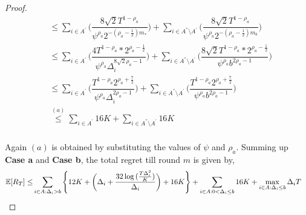 \begin{proof}
\begin{align*}
&\leq\sum_{i\in A^{'}}\bigg(\dfrac{8\sqrt{2}T^{1-\rho_{a}}}{\psi^{\rho_{a}}2^{-(\rho_{a}-\frac{1}{2})m_{*}}} \bigg)+\sum_{i\in A^{''}\setminus A^{'}}\bigg(\dfrac{8\sqrt{2}T^{1-\rho_{a}}}{\psi^{\rho_{a}}2^{-(\rho_{a}-\frac{1}{2})m_{b}}} \bigg)\\
&\leq\sum_{i\in A^{'}}\bigg(\dfrac{4T^{1-\rho_{a}}*2^{\rho_{a}-\frac{1}{2}}}{\psi^{\rho_{a}}\Delta_{i}^{8\sqrt{2}\rho_{a}-1}} \bigg)+\sum_{i\in A^{''}\setminus A^{'}}\bigg(\dfrac{8\sqrt{2}T^{1-\rho_{a}}*2^{\rho_{a}-\frac{1}{2}}}{\psi^{\rho_{a}}b^{2\rho_{a}-1}} \bigg)\\
&\leq\sum_{i\in A^{'}}\bigg(\dfrac{T^{1-\rho_{a}}2^{\rho_{a}+\frac{7}{2}}}{\psi^{\rho_{a}}\Delta_{i}^{2\rho_{a}-1}} \bigg)+\sum_{i\in A^{''}\setminus A^{'}}\bigg(\dfrac{T^{1-\rho_{a}}2^{\rho_{a}+\frac{7}{2}}}{\psi^{\rho_{a}}b^{2\rho_{a}-1}} \bigg)\\
&\overset{(a)}{\leq}\sum_{i\in A^{'}}16K +\sum_{i\in A^{''}\setminus A^{'}} 16K\\
\end{align*}

Again $(a)$ is obtained by substituting the values of $\psi$ and $\rho_a$. Summing up \textbf{Case a} and \textbf{Case b}, the total regret till round $m$ is given by,
\begin{align*}
 \mathbb{E}[R_{T}] \leq &\sum\limits_{i\in A:\Delta_{i} > b} \left\lbrace 12K + \bigg(\Delta_{i}+\dfrac{32\log{(\frac{T\Delta_i^2}{K})}}{\Delta_{i}}\bigg) + 16K\right\rbrace +\sum\limits_{i\in A:0 < \Delta_{i}\leq b} 16K + \max_{i\in A:\Delta_{i}\leq b}\Delta_{i}T
\end{align*}
\end{proof}



